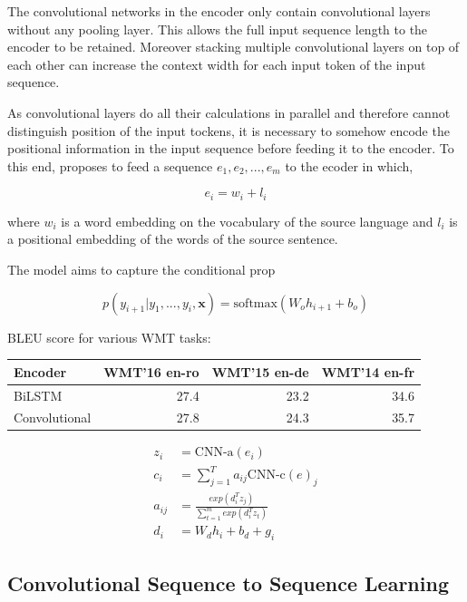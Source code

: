 \documentclass[a4paper]{article}
\begin{document}
The convolutional networks in the encoder only contain convolutional layers without any pooling layer. This allows the full input sequence length to the encoder to be retained. Moreover stacking multiple convolutional layers on top of each other can increase the context width for each input token of the input sequence.

As convolutional layers do all their calculations in parallel and therefore cannot distinguish position of the input tockens, it is necessary to somehow encode the positional information in the input sequence before feeding it to the encoder. To this end, \citet{DBLP:journals/corr/GehringAGD16} proposes to feed a sequence $e_1, e_2, ..., e_m$ to the ecoder in which,

\begin{equation*}
  e_i = w_i + l_i
\end{equation*}

where $w_i$ is a word embedding on the vocabulary of the source language and $l_i$ is a positional embedding of the words of the source sentence.


The model aims to capture the conditional prop

\begin{equation*}
  p(y_{i+1} \vert y_1, ..., y_i, \textbf{x}) =
  \text{softmax}(W_o h_{i + 1} + b_o)
\end{equation*}


BLEU score for various WMT tasks:


\begin{center}
  \begin{tabular}{lrrr}
  \hline
    Encoder & WMT'16 en-ro & WMT'15 en-de & WMT'14 en-fr \\
  \hline
    BiLSTM & 27.4 & 23.2 & 34.6 \\
    Convolutional & 27.8 & 24.3 & 35.7 \\
  \hline
  \end{tabular}
\end{center}


\begin{align*}
  z_i &= \text{CNN-a}(e_i) \\
  c_i &= \sum_{j = 1}^{T}{a_{ij}\text{CNN-c}(e)_j} \\
  a_{ij} &= \frac{exp(d_i^T z_j)}{\sum_{t = 1}^{m}{exp(d_i^T z_t)}} \\
  d_i &= W_d h_i + b_d + g_i
\end{align*}


\subsection{Convolutional Sequence to Sequence Learning}
\end{document}
